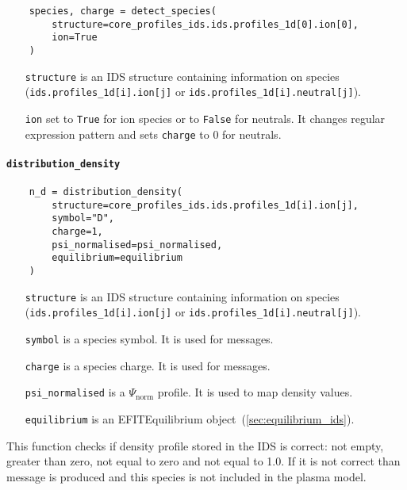\documentclass[../main.tex]{subfiles}
\begin{document}
\begin{verbatim}
    species, charge = detect_species(
        structure=core_profiles_ids.ids.profiles_1d[0].ion[0],
        ion=True
    )
\end{verbatim}

\begin{itemize}[align=left]
    \item[\texttt{structure}] is an IDS structure containing information on species (\texttt{ids.profiles\_1d[i].ion[j]} or \texttt{ids.profiles\_1d[i].neutral[j]}).
    \item[\texttt{ion}] set to \texttt{True} for ion species or to \texttt{False} for neutrals. It changes regular expression pattern and sets \texttt{charge} to 0 for neutrals.
\end{itemize}

\paragraph{\texttt{distribution\_density}}%
\label{par:distribution_density}

\begin{verbatim}
    n_d = distribution_density(
        structure=core_profiles_ids.ids.profiles_1d[i].ion[j],
        symbol="D",
        charge=1,
        psi_normalised=psi_normalised,
        equilibrium=equilibrium
    )
\end{verbatim}

\begin{itemize}[align=left]
    \item[\texttt{structure}] is an IDS structure containing information on species (\texttt{ids.profiles\_1d[i].ion[j]} or \texttt{ids.profiles\_1d[i].neutral[j]}).
    \item[\texttt{symbol}] is a species symbol. It is used for messages.
    \item[\texttt{charge}] is a species charge. It is used for messages.
    \item[\texttt{psi\_normalised}] is a $\Psi_\text{norm}$ profile. It is used to map density values.
    \item[\texttt{equilibrium}] is an EFITEquilibrium object~(\cref{sec:equilibrium_ids}).
\end{itemize}

This function checks if density profile stored in the IDS is correct: not empty, greater than zero, not equal to zero and not equal to 1.0. If it is not correct than message is produced and this species is not included in the plasma model.
\end{document}
